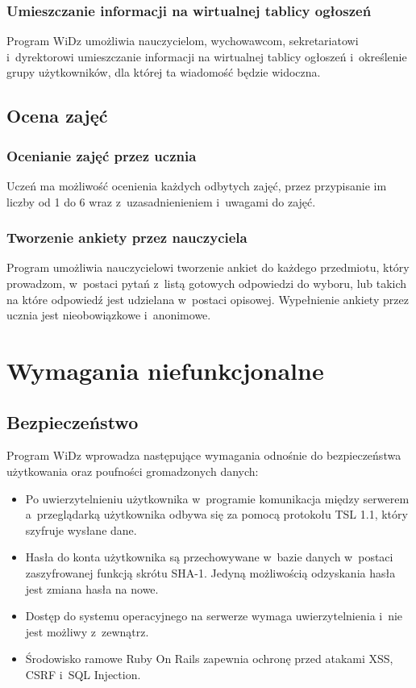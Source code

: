 \documentclass[12pt,leqno,twoside]{mwart}
\begin{document}
\subsubsection{Umieszczanie informacji na wirtualnej tablicy ogłoszeń}
\noindent Program WiDz umożliwia nauczycielom, wychowawcom, sekretariatowi i~dyrektorowi umieszczanie informacji na wirtualnej tablicy ogłoszeń i~określenie grupy użytkowników, dla której ta wiadomość będzie widoczna.

\subsection{Ocena zajęć}
\subsubsection{Ocenianie zajęć przez ucznia}
\noindent Uczeń ma możliwość ocenienia każdych odbytych zajęć, przez przypisanie im liczby od 1 do 6 wraz z~uzasadnienieniem i~uwagami do zajęć.

\subsubsection{Tworzenie ankiety przez nauczyciela}
\noindent Program umożliwia nauczycielowi tworzenie ankiet do każdego przedmiotu, który prowadzom, w~postaci pytań z~listą gotowych odpowiedzi do wyboru, lub takich na które odpowiedź jest udzielana w~postaci opisowej. Wypełnienie ankiety przez ucznia jest nieobowiązkowe i~anonimowe.

\section{Wymagania niefunkcjonalne}
\subsection{Bezpieczeństwo}
\noindent Program WiDz wprowadza następujące wymagania odnośnie do bezpieczeństwa użytkowania oraz poufności gromadzonych danych:
\begin{itemize}
	\item Po uwierzytelnieniu użytkownika w~programie komunikacja między serwerem a~przeglądarką użytkownika odbywa się za pomocą protokołu TSL 1.1, który szyfruje wysłane dane.
	\item Hasła do konta użytkownika są przechowywane w~bazie danych w~postaci zaszyfrowanej funkcją skrótu SHA-1. Jedyną możliwością odzyskania hasła jest zmiana hasła na nowe.
	\item Dostęp do systemu operacyjnego na serwerze wymaga uwierzytelnienia i~nie jest możliwy z~zewnątrz.
	\item Środowisko ramowe Ruby On Rails zapewnia ochronę przed atakami XSS, CSRF i~SQL Injection.
\end{itemize}
\end{document}
